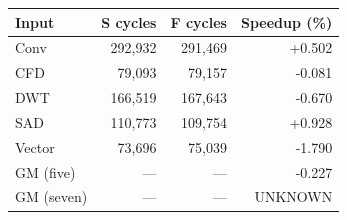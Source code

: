 \begin{tabular}{lrrr}
\hline
Input & S cycles & F cycles & Speedup (\%) \\
\hline
Conv & 292,932 & 291,469 & +0.502 \\
CFD & 79,093 & 79,157 & -0.081 \\
DWT & 166,519 & 167,643 & -0.670 \\
SAD & 110,773 & 109,754 & +0.928 \\
Vector & 73,696 & 75,039 & -1.790 \\
\hline
GM (five) & --- & --- & -0.227 \\
GM (seven) & --- & --- & UNKNOWN \\
\hline
\end{tabular}
